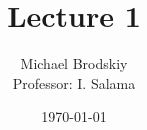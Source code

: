 


\title{Lecture 1}
\date{\today}
\author{Michael Brodskiy\\ \small Professor: I. Salama}



\maketitle

